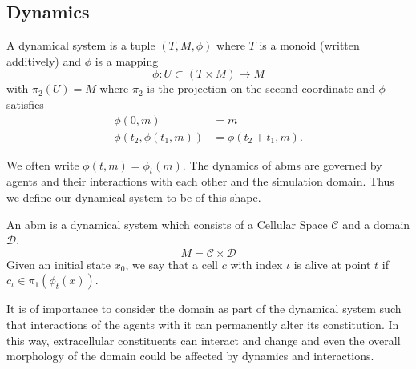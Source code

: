 \subsection{Dynamics}
\label{section:dynamics}
\begin{definition}
    A dynamical system is a tuple $(T,M,\phi)$ where $T$ is a monoid (written additively) and
    $\phi$ is a mapping
    \begin{equation}
        \phi : U\subset(T\times M) \rightarrow M
    \end{equation}
    with $\pi_2(U) = M$ where $\pi_2$ is the projection on the second coordinate and $\phi$
    satisfies
    \begin{align}
        \phi(0,m) &= m\\
        \phi(t_2, \phi(t_1, m)) &= \phi(t_2+t_1,m).
    \end{align}
\end{definition}

We often write $\phi(t,m) = \phi_t(m)$.
The dynamics of \acp{abm} are governed by agents and their interactions with each other and the
simulation domain.
Thus we define our dynamical system to be of this shape.

\begin{definition}
    An \ac{abm} is a dynamical system which consists of a Cellular Space $\mathscr{C}$ and a domain
    $\mathscr{D}$.
    \begin{equation}
        M = \mathscr{C}\times\mathscr{D}
    \end{equation}
    Given an initial state $x_0$, we say that a cell $c$ with index $\iota$ is alive at point $t$ if
    $c_\iota\in\pi_1(\phi_t(x))$.
\end{definition}

It is of importance to consider the domain as part of the dynamical system such that interactions
of the agents with it can permanently alter its constitution.
In this way, extracellular constituents can interact and change and even the overall morphology of
the domain could be affected by dynamics and interactions.


